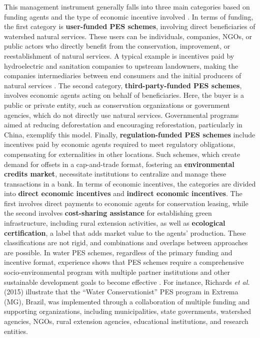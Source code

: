 \documentclass[./main_en.tex]{subfiles}
\begin{document}
\par This management instrument generally falls into three main categories based on funding agents and the type of economic incentive involved \cite{Smith2006a, Salzman2018a}. In terms of funding, the first category is \textbf{user-funded PES schemes}, involving direct beneficiaries of watershed natural services. These users can be individuals, companies, NGOs, or public actors who directly benefit from the conservation, improvement, or reestablishment of natural services. A typical example is incentives paid by hydroelectric and sanitation companies to upstream landowners, making the companies intermediaries between end consumers and the initial producers of natural services \cite{Fuentes-Llanillo2021}. The second category, \textbf{third-party-funded PES schemes}, involves economic agents acting on behalf of beneficiaries. Here, the buyer is a public or private entity, such as conservation organizations or government agencies, which do not directly use natural services. Governmental programs aimed at reducing deforestation and encouraging reforestation, particularly in China, exemplify this model. Finally, \textbf{regulation-funded PES schemes} include incentives paid by economic agents required to meet regulatory obligations, compensating for externalities in other locations. Such schemes, which create demand for offsets in a cap-and-trade format, fostering an \textbf{environmental credits market}, necessitate institutions to centralize and manage these transactions in a bank. In terms of economic incentives, the categories are divided into \textbf{direct economic incentives} and \textbf{indirect economic incentives}. The first involves direct payments to economic agents for conservation leasing, while the second involves \textbf{cost-sharing assistance} for establishing green infrastructure, including rural extension activities, as well as \textbf{ecological certification}, a label that adds market value to the agents' production. These classifications are not rigid, and combinations and overlaps between approaches are possible. In water PES schemes, regardless of the primary funding and incentive format, experience shows that PES schemes require a comprehensive socio-environmental program with multiple partner institutions and other sustainable development goals to become effective \cite{Viani2019a}. For instance, Richards \textit{et al.} (2015) \cite{Richards1931a} illustrate that the “Water Conservationist” PES program in Extrema (MG), Brazil, was implemented through a collaboration of multiple funding and supporting organizations, including municipalities, state governments, watershed agencies, NGOs, rural extension agencies, educational institutions, and research entities.
\end{document}

